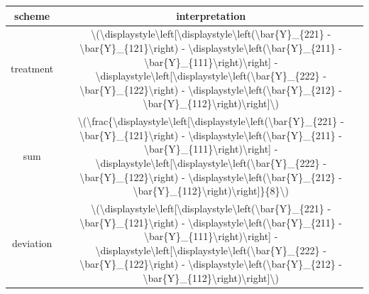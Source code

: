 \documentclass[]{book}
\begin{document}
\begin{table}[H]
\centering
\begin{tabular}{c|c}
\hline
scheme & interpretation\\
\hline
treatment & \textbackslash{}(\textbackslash{}displaystyle\textbackslash{}left[\textbackslash{}displaystyle\textbackslash{}left(\textbackslash{}bar\{Y\}\_\{221\} - \textbackslash{}bar\{Y\}\_\{121\}\textbackslash{}right) - \textbackslash{}displaystyle\textbackslash{}left(\textbackslash{}bar\{Y\}\_\{211\} - \textbackslash{}bar\{Y\}\_\{111\}\textbackslash{}right)\textbackslash{}right] - \textbackslash{}displaystyle\textbackslash{}left[\textbackslash{}displaystyle\textbackslash{}left(\textbackslash{}bar\{Y\}\_\{222\} - \textbackslash{}bar\{Y\}\_\{122\}\textbackslash{}right) - \textbackslash{}displaystyle\textbackslash{}left(\textbackslash{}bar\{Y\}\_\{212\} - \textbackslash{}bar\{Y\}\_\{112\}\textbackslash{}right)\textbackslash{}right]\textbackslash{})\\
\hline
sum & \textbackslash{}(\textbackslash{}frac\{\textbackslash{}displaystyle\textbackslash{}left[\textbackslash{}displaystyle\textbackslash{}left(\textbackslash{}bar\{Y\}\_\{221\} - \textbackslash{}bar\{Y\}\_\{121\}\textbackslash{}right) - \textbackslash{}displaystyle\textbackslash{}left(\textbackslash{}bar\{Y\}\_\{211\} - \textbackslash{}bar\{Y\}\_\{111\}\textbackslash{}right)\textbackslash{}right] - \textbackslash{}displaystyle\textbackslash{}left[\textbackslash{}displaystyle\textbackslash{}left(\textbackslash{}bar\{Y\}\_\{222\} - \textbackslash{}bar\{Y\}\_\{122\}\textbackslash{}right) - \textbackslash{}displaystyle\textbackslash{}left(\textbackslash{}bar\{Y\}\_\{212\} - \textbackslash{}bar\{Y\}\_\{112\}\textbackslash{}right)\textbackslash{}right]\}\{8\}\textbackslash{})\\
\hline
deviation & \textbackslash{}(\textbackslash{}displaystyle\textbackslash{}left[\textbackslash{}displaystyle\textbackslash{}left(\textbackslash{}bar\{Y\}\_\{221\} - \textbackslash{}bar\{Y\}\_\{121\}\textbackslash{}right) - \textbackslash{}displaystyle\textbackslash{}left(\textbackslash{}bar\{Y\}\_\{211\} - \textbackslash{}bar\{Y\}\_\{111\}\textbackslash{}right)\textbackslash{}right] - \textbackslash{}displaystyle\textbackslash{}left[\textbackslash{}displaystyle\textbackslash{}left(\textbackslash{}bar\{Y\}\_\{222\} - \textbackslash{}bar\{Y\}\_\{122\}\textbackslash{}right) - \textbackslash{}displaystyle\textbackslash{}left(\textbackslash{}bar\{Y\}\_\{212\} - \textbackslash{}bar\{Y\}\_\{112\}\textbackslash{}right)\textbackslash{}right]\textbackslash{})\\
\hline
\end{tabular}
\end{table}
\end{document}
